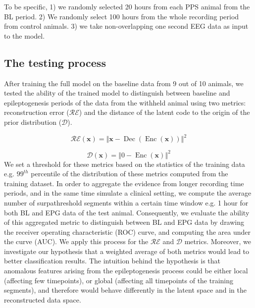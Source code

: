 \documentclass{article}
\begin{document}
	To be specific, 1) we randomly selected 20 hours from each PPS animal from the BL period. 2) We randomly select 100 hours from the whole recording period from control animals. 3) we take non-overlapping one second EEG data as input to the model.
	
	
	
	\subsection{The testing process}
	After training the full model on the baseline data from 9 out of 10 animals, we tested the ability of the trained model to distinguish between baseline and epileptogenesis periods of the data from the withheld animal using two metrics: reconstruction error ($\mathcal{RE}$) and the distance of the latent code to the origin of the prior distribution ($\mathcal{D}$). 
	
	\begin{equation}
	\mathcal{RE(\mathbf{x})}= \left\Vert \mathbf{x} - \operatorname{Dec}(\operatorname{Enc}(\mathbf{x})) \right\Vert^2 
	\end{equation}
	
	\begin{equation}
	\mathcal{D}(\mathbf{x})= \left\Vert 0 - \operatorname{Enc}(\mathbf{x}) \right\Vert^2
	\end{equation}
	We set a threshold for these metrics based on the statistics of the training data e.g. $99^{th}$ percentile of the distribution of these metrics computed from the training dataset. In order to aggregate the evidence from longer recording time periods, and in the same time simulate a clinical setting, we compute the average number of surpathreshold segments within a certain time window e.g. 1 hour for both BL and EPG data of the test animal. Consequently, we evaluate the ability of this aggregated metric to distinguish between BL and EPG data by drawing the receiver operating characteristic (ROC) curve, and computing the area under the curve (AUC). We apply this process for the $\mathcal{RE}$ and $\mathcal{D}$ metrics. Moreover, we investigate our hypothesis that a weighted average of both metrics would lead to better classification results. The intuition behind the hypothesis is that anomalous features arising from the epileptogenesis process could be either local (affecting few timepoints), or global (affecting all timepoints of the training segments), and therefore would behave differently in the latent space and in the reconstructed data space.
	
\end{document}
